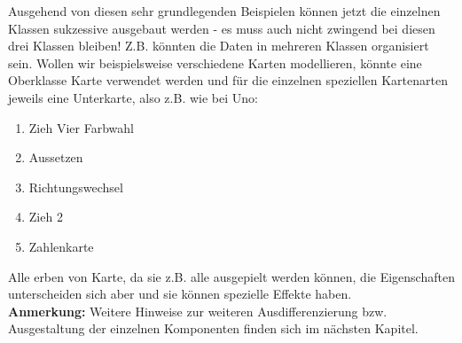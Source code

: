 \documentclass{article}
\begin{document}
Ausgehend von diesen sehr grundlegenden Beispielen können jetzt die einzelnen Klassen sukzessive ausgebaut werden - es muss auch nicht zwingend bei diesen drei Klassen bleiben! Z.B. könnten die Daten in mehreren Klassen organisiert sein. Wollen wir beispielsweise verschiedene Karten modellieren, könnte eine Oberklasse Karte verwendet werden und für die einzelnen speziellen Kartenarten jeweils eine Unterkarte, also z.B. wie bei Uno:
\begin{enumerate}
    \item Zieh Vier Farbwahl
    \item Aussetzen
    \item Richtungswechsel
    \item Zieh 2
    \item Zahlenkarte
\end{enumerate}
Alle erben von Karte, da sie z.B. alle ausgepielt werden können, die Eigenschaften unterscheiden sich aber und sie können spezielle Effekte haben. \\
\textbf{Anmerkung:} Weitere Hinweise zur weiteren Ausdifferenzierung bzw. Ausgestaltung der einzelnen Komponenten finden sich im nächsten Kapitel.
\end{document}

